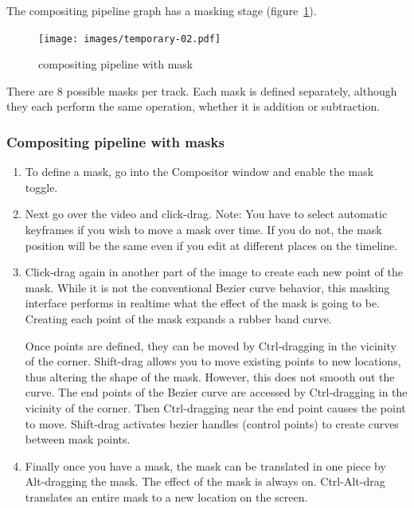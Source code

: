 The compositing pipeline graph has a masking stage (figure~\ref{fig:temporary-02}).

\begin{figure}[htpb]
    \centering
    \texttt{[image: images/temporary-02.pdf]}
    \caption{compositing pipeline with mask}
    \label{fig:temporary-02}
\end{figure}

There are 8 possible masks per track. Each mask is defined separately, although they each perform the same operation, whether it is addition or subtraction.

\subsubsection*{Compositing pipeline with masks}%
\label{ssub:compositing_pipeline_with_masks}

\begin{enumerate}
    \item To define a mask, go into the Compositor window and enable the mask toggle.
    \item  Next go over the video and click-drag. 
        Note: You have to select automatic keyframes if you wish to move a mask over time.  
        If you do not, the mask position will be the same even if you edit at different places on the timeline.
    \item  Click-drag again in another part of the image to create each new point of the mask. 
        While it is not the conventional Bezier curve behavior, this masking interface performs in realtime what the effect 
        of the mask is going to be. Creating each point of the mask expands a rubber band curve.

        Once points are defined, they can be moved by Ctrl-dragging in the vicinity of the corner. 
        Shift-drag allows you to move existing points to new locations, thus altering the shape of the mask.  
        However, this does not smooth out the curve. 
        The end points of the Bezier curve are accessed by Ctrl-dragging in the vicinity of the corner. 
        Then Ctrl-dragging near the end point causes the point to move.  
        Shift-drag activates bezier handles (control points) to create curves between mask points.       

    \item  Finally once you have a mask, the mask can be translated in one piece by Alt-dragging the mask.
    The effect of the mask is always on.  
    Ctrl-Alt-drag translates an entire mask to a new location on the
    screen.
\end{enumerate}

